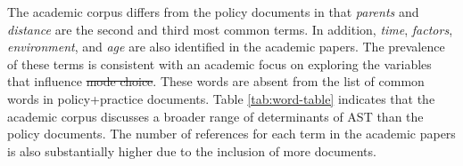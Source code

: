 \documentclass[preprint, 3p,
authoryear]{elsarticle} %
\providecommand{\DIFaddtex}[1]{{\protect\color{blue}\uwave{#1}}} %
\providecommand{\DIFdeltex}[1]{{\protect\color{red}\sout{#1}}}                      %
\providecommand{\DIFaddbegin}{} %
\providecommand{\DIFaddend}{} %
\providecommand{\DIFdelbegin}{} %
\providecommand{\DIFdelend}{} %
\providecommand{\DIFadd}[1]{\texorpdfstring{\DIFaddtex{#1}}{#1}} %
\providecommand{\DIFdel}[1]{\texorpdfstring{\DIFdeltex{#1}}{}} %
\newcommand{\DIFscaledelfig}{0.5}
\newlength{\DIFdelgraphicswidth} %
\newlength{\DIFdelgraphicsheight} %
\newcommand{\DIFaddincludegraphics}[2][]{{\color{blue}\fbox{\DIFOincludegraphics[#1]{#2}}}} %
\newcommand{\DIFdelincludegraphics}[2][]{%
\sbox{\DIFdelgraphicsbox}{\DIFOincludegraphics[#1]{#2}}%
\settoboxwidth{\DIFdelgraphicswidth}{\DIFdelgraphicsbox} %
\settoboxtotalheight{\DIFdelgraphicsheight}{\DIFdelgraphicsbox} %
\scalebox{\DIFscaledelfig}{%
\parbox[b]{\DIFdelgraphicswidth}{\usebox{\DIFdelgraphicsbox}\\[-\baselineskip] \rule{\DIFdelgraphicswidth}{0em}}\llap{\resizebox{\DIFdelgraphicswidth}{\DIFdelgraphicsheight}{%
\setlength{\unitlength}{\DIFdelgraphicswidth}%
\begin{picture}(1,1)%
\thicklines\linethickness{2pt} %
{\color[rgb]{1,0,0}\put(0,0){\framebox(1,1){}}}%
{\color[rgb]{1,0,0}\put(0,0){\line( 1,1){1}}}%
{\color[rgb]{1,0,0}\put(0,1){\line(1,-1){1}}}%
\end{picture}%
}\hspace*{3pt}}} %
} %
\DeclareRobustCommand{\DIFaddbegin}{\DIFOaddbegin \let\includegraphics\DIFaddincludegraphics} %
\DeclareRobustCommand{\DIFaddend}{\DIFOaddend \let\includegraphics\DIFOincludegraphics} %
\DeclareRobustCommand{\DIFdelbegin}{\DIFOdelbegin \let\includegraphics\DIFdelincludegraphics} %
\DeclareRobustCommand{\DIFdelend}{\DIFOaddend \let\includegraphics\DIFOincludegraphics} %
\begin{document}
The academic corpus differs from the policy documents in that
\emph{parents} and \emph{distance} are the second and third most common
terms. In addition, \emph{time}, \emph{factors}, \emph{environment}, and
\emph{age} are also identified in the academic papers. The prevalence of
these terms is consistent with an academic focus on exploring the
variables that influence \DIFdelbegin \DIFdel{mode choice}\DIFdelend \DIFaddbegin \DIFadd{travel to school}\DIFaddend . These words are absent from
the list of common words in policy+practice documents. Table
\ref{tab:word-table} indicates that the academic corpus discusses a
broader range of determinants of AST than the policy documents. The
number of references for each term in the academic papers is also
substantially higher due to the inclusion of more documents.

\begin{table}


\end{table}
\end{document}
